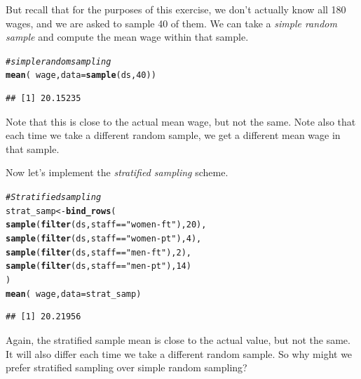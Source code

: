 \documentclass[10pt]{article}\usepackage[]{graphicx}\usepackage[]{color}
\makeatletter
\newcommand{\hlnum}[1]{\textcolor[rgb]{0.686,0.059,0.569}{#1}}%
\newcommand{\hlstr}[1]{\textcolor[rgb]{0.192,0.494,0.8}{#1}}%
\newcommand{\hlcom}[1]{\textcolor[rgb]{0.678,0.584,0.686}{\textit{#1}}}%
\newcommand{\hlopt}[1]{\textcolor[rgb]{0,0,0}{#1}}%
\newcommand{\hlstd}[1]{\textcolor[rgb]{0.345,0.345,0.345}{#1}}%
\newcommand{\hlkwb}[1]{\textcolor[rgb]{0.69,0.353,0.396}{#1}}%
\newcommand{\hlkwc}[1]{\textcolor[rgb]{0.333,0.667,0.333}{#1}}%
\newcommand{\hlkwd}[1]{\textcolor[rgb]{0.737,0.353,0.396}{\textbf{#1}}}%
\newenvironment{kframe}{%
 \def\at@end@of@kframe{}%
 \ifinner\ifhmode%
  \def\at@end@of@kframe{\end{minipage}}%
  \begin{minipage}{\columnwidth}%
 \fi\fi%
 \def\FrameCommand##1{\hskip\@totalleftmargin \hskip-\fboxsep
 \colorbox{shadecolor}{##1}\hskip-\fboxsep
     \hskip-\linewidth \hskip-\@totalleftmargin \hskip\columnwidth}%
 \MakeFramed {\advance\hsize-\width
   \@totalleftmargin\z@ \linewidth\hsize
   \@setminipage}}%
 {\par\unskip\endMakeFramed%
 \at@end@of@kframe}
\newenvironment{knitrout}{}{} %
\makeatother
\begin{document}
But recall that for the purposes of this exercise, we don't actually know all 180 wages, and we are asked to sample 40 of them. We can take a \emph{simple random sample} and compute the mean wage within that sample.

\begin{knitrout}
\color{fgcolor}\begin{kframe}
\begin{alltt}
\hlcom{# simple random sampling}
\hlkwd{mean}\hlstd{(}\hlopt{~}\hlstd{wage,} \hlkwc{data} \hlstd{=} \hlkwd{sample}\hlstd{(ds,} \hlnum{40}\hlstd{))}
\end{alltt}
\begin{verbatim}
## [1] 20.15235
\end{verbatim}
\end{kframe}
\end{knitrout}

Note that this is close to the actual mean wage, but not the same. Note also that each time we take a different random sample, we get a different mean wage in that sample. 

Now let's implement the \emph{stratified sampling} scheme.

\begin{knitrout}
\color{fgcolor}\begin{kframe}
\begin{alltt}
\hlcom{# Stratified sampling}
\hlstd{strat_samp} \hlkwb{<-} \hlkwd{bind_rows}\hlstd{(}
  \hlkwd{sample}\hlstd{(}\hlkwd{filter}\hlstd{(ds, staff} \hlopt{==} \hlstr{"women-ft"}\hlstd{),} \hlnum{20}\hlstd{),}
  \hlkwd{sample}\hlstd{(}\hlkwd{filter}\hlstd{(ds, staff} \hlopt{==} \hlstr{"women-pt"}\hlstd{),} \hlnum{4}\hlstd{),}
  \hlkwd{sample}\hlstd{(}\hlkwd{filter}\hlstd{(ds, staff} \hlopt{==} \hlstr{"men-ft"}\hlstd{),} \hlnum{2}\hlstd{),}
  \hlkwd{sample}\hlstd{(}\hlkwd{filter}\hlstd{(ds, staff} \hlopt{==} \hlstr{"men-pt"}\hlstd{),} \hlnum{14}\hlstd{)}
\hlstd{)}
\hlkwd{mean}\hlstd{(}\hlopt{~}\hlstd{wage,} \hlkwc{data} \hlstd{= strat_samp)}
\end{alltt}
\begin{verbatim}
## [1] 20.21956
\end{verbatim}
\end{kframe}
\end{knitrout}

Again, the stratified sample mean is close to the actual value, but not the same. It will also differ each time we take a different random sample. So why might we prefer stratified sampling over simple random sampling?
  
\end{document}
